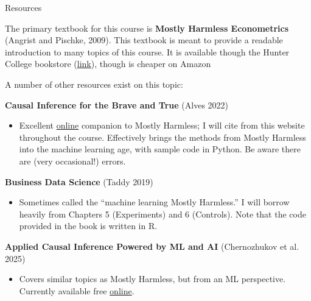 \documentclass[compress, 8pt]{beamer}
\begin{document}
\begin{frame}{Resources}

The primary textbook for this course is \textbf{Mostly Harmless Econometrics} (Angrist and Pischke, 2009).
This textbook is meant to provide a readable introduction to many topics of this course. 
It is available though the Hunter College bookstore (\href{https://hunter.textbookx.com/institutional/index.php?action=browse\#books/4891202/}{link}), though is cheaper on Amazon 

\vspace{2ex}
A number of other resources exist on this topic:

\vspace{1ex}
\textbf{Causal Inference for the Brave and True} (Alves 2022)
\begin{itemize}
\item Excellent \href{https://matheusfacure.github.io/python-causality-handbook/landing-page.html}{online} companion to Mostly Harmless; I will cite from this website throughout the course. Effectively brings the methods from Mostly Harmless into the machine learning age, with sample code in Python. Be aware there are (very occasional!) errors.
\end{itemize}

\vspace{1ex}
\textbf{Business Data Science} (Taddy 2019) %
\begin{itemize}
\item Sometimes called the ``machine learning Mostly Harmless.'' I will borrow heavily from Chapters 5 (Experiments) and 6 (Controls). Note that the code provided in the book is written in R. 
\end{itemize}

\vspace{1ex}
\textbf{Applied Causal Inference Powered by ML and AI} (Chernozhukov et al. 2025)
\begin{itemize}
\item Covers similar topics as Mostly Harmless, but from an ML perspective. Currently available free \href{https://causalml-book.org/}{online}. 
\end{itemize}

\end{frame}
\end{document}

